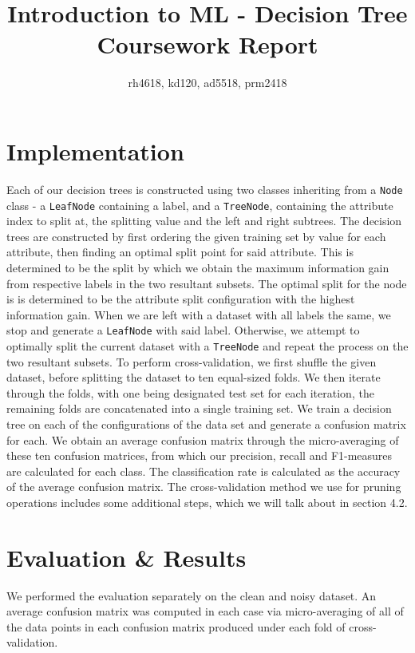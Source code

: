 \documentclass[11pt, a4paper]{article}
\title{Introduction to ML - Decision Tree Coursework Report}
\author{rh4618, kd120, ad5518, prm2418}
\begin{document}
\maketitle

\section{Implementation}
  \noindent
  Each of our decision trees is constructed using two classes inheriting
  from a \texttt{Node} class - a \texttt{LeafNode} containing a label, and a
  \texttt{TreeNode}, containing the attribute index to split at, the splitting
  value and the left and right subtrees. The decision trees are constructed by
  first ordering the given training set by value for each attribute, then finding
  an optimal split point for said attribute. This is determined to be the split
  by which we obtain the maximum information gain from respective labels in the
  two resultant subsets. The optimal split for the node is is determined to be
  the attribute split configuration with the highest information gain. When we
  are left with a dataset with all labels the same, we stop and generate a
  \texttt{LeafNode} with said label. Otherwise, we attempt to optimally split
  the current dataset with a \texttt{TreeNode} and repeat the process on the two
  resultant subsets.
  \newline\newline\noindent
  To perform cross-validation, we first shuffle the given dataset, before
  splitting the dataset to ten equal-sized folds. We then iterate through the
  folds, with one being designated test set for each iteration, the remaining
  folds are concatenated into a single training set. We train a decision tree on
  each of the configurations of the data set and generate a confusion matrix for
  each. We obtain an average confusion matrix through the micro-averaging of
  these ten confusion matrices, from which our precision, recall and F1-measures
  are calculated for each class. The classification rate is calculated as the
  accuracy of the average confusion matrix.
  \newline\newline\noindent
  The cross-validation method we use for pruning operations includes some
  additional steps, which we will talk about in section 4.2.

\section{Evaluation \& Results}
We performed the evaluation separately on the clean and noisy dataset. An average confusion matrix was computed in each case via micro-averaging of all of the data points in each confusion matrix produced under each fold of cross-validation.
\end{document}

